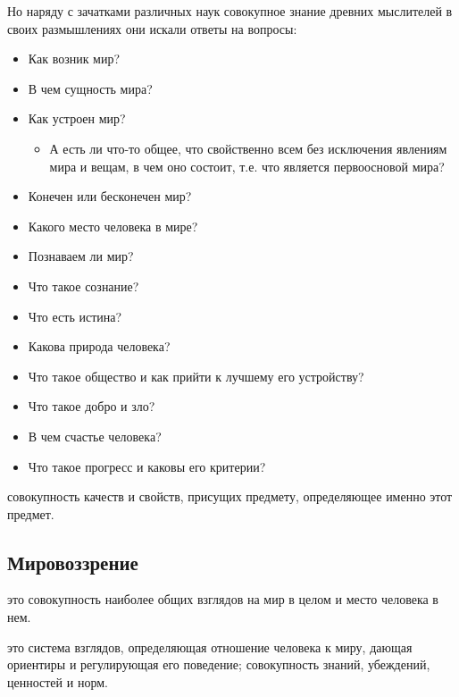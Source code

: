 \documentclass[
]{article}
\providecommand{\tightlist}{%
  \setlength{\itemsep}{0pt}\setlength{\parskip}{0pt}}
\begin{document}
Но наряду с зачатками различных наук совокупное знание древних
мыслителей в своих размышлениях они искали ответы на вопросы:

\begin{itemize}
\tightlist
\item
  Как возник мир?
\item
  В чем сущность мира?
\item
  Как устроен мир?

  \begin{itemize}
  \tightlist
  \item
    А есть ли что-то общее, что свойственно всем без исключения явлениям
    мира и вещам, в чем оно состоит, т.е. что является первоосновой
    мира?
  \end{itemize}
\item
  Конечен или бесконечен мир?
\item
  Какого место человека в мире?
\item
  Познаваем ли мир?
\item
  Что такое сознание?
\item
  Что есть истина?
\item
  Какова природа человека?
\item
  Что такое общество и как прийти к лучшему его устройству?
\item
  Что такое добро и зло?
\item
  В чем счастье человека?
\item
  Что такое прогресс и каковы его критерии?
\end{itemize}

\begin{description}
\tightlist
\item[\emph{Сущность} ---]
совокупность качеств и свойств, присущих предмету, определяющее именно
этот предмет.
\end{description}

\hypertarget{ux43cux438ux440ux43eux432ux43eux437ux437ux440ux435ux43dux438ux435}{%
\subsection{Мировоззрение}\label{ux43cux438ux440ux43eux432ux43eux437ux437ux440ux435ux43dux438ux435}}

\begin{description}
\tightlist
\item[\emph{1. Мировоззрение} ---]
это совокупность наиболее общих взглядов на мир в целом и место человека
в нем.
\item[\emph{2. Мировоззрение} ---]
это система взглядов, определяющая отношение человека к миру, дающая
ориентиры и регулирующая его поведение; совокупность знаний, убеждений,
ценностей и норм.
\end{description}
\end{document}
